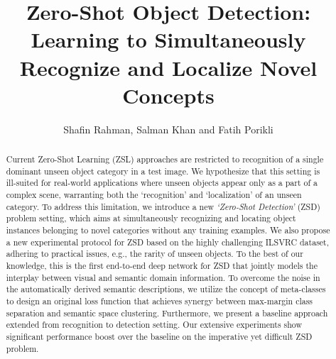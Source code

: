 \documentclass[runningheads]{llncs}
\begin{document}
\pagestyle{headings}
\mainmatter

\title{Zero-Shot Object Detection: Learning to Simultaneously Recognize and Localize  Novel Concepts} 



\author{Shafin Rahman, Salman Khan and Fatih Porikli}





\maketitle

\begin{abstract}
Current Zero-Shot Learning (ZSL) approaches are restricted to recognition of a single dominant unseen object category in a test image. We hypothesize that this setting is ill-suited for real-world applications where unseen objects appear only as a part of a complex scene, warranting both the `recognition' and `localization' of an unseen category. To address this limitation, we introduce a new \emph{`Zero-Shot Detection'} (ZSD) problem setting, which aims at simultaneously recognizing and locating object instances belonging to novel categories without any training examples. We also propose a new experimental protocol for ZSD based on the highly challenging ILSVRC dataset, adhering to practical issues, e.g., the rarity of unseen objects. To the best of our knowledge, this is the first end-to-end deep network for ZSD that jointly models the interplay between visual and semantic domain information. To overcome the noise in the automatically derived semantic descriptions, we utilize the concept of meta-classes to design an original loss function that achieves synergy between max-margin class separation and semantic space clustering. Furthermore, we present a baseline approach extended from recognition to detection setting. Our extensive experiments show significant performance boost over the baseline on the imperative yet difficult ZSD problem.
\end{abstract}
\end{document}

